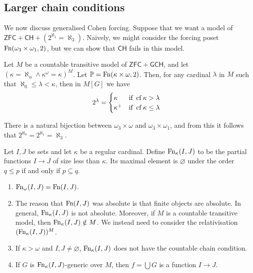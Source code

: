 \subsection{Larger chain conditions}
We now discuss generalised Cohen forcing.
Suppose that we want a model of \( \mathsf{ZFC} + \mathsf{CH} + (2^{\aleph_1} = \aleph_3) \).
Naively, we might consider the forcing poset \( \operatorname{Fn}(\omega_3 \times \omega_1, 2) \), but we can show that \( \mathsf{CH} \) fails in this model.
\begin{proposition}
    Let \( M \) be a countable transitive model of \( \mathsf{ZFC} + \mathsf{GCH} \), and let \( (\kappa = \aleph_\alpha \wedge \kappa^\omega = \kappa)^M \).
    Let \( \mathbb P = \operatorname{Fn}(\kappa \times \omega, 2) \).
    Then, for any cardinal \( \lambda \) in \( M \) such that \( \aleph_0 \leq \lambda < \kappa \), then in \( M[G] \) we have
    \[ 2^\lambda = \begin{cases}
        \kappa & \text{if } \operatorname{cf} \kappa > \lambda \\
        \kappa^+ & \text{if } \operatorname{cf} \kappa \leq \lambda
    \end{cases} \]
\end{proposition}
There is a natural bijection between \( \omega_3 \times \omega \) and \( \omega_3 \times \omega_1 \), and from this it follows that \( 2^{\aleph_0} = 2^{\aleph_1} = \aleph_3 \).
\begin{definition}
    Let \( I, J \) be sets and let \( \kappa \) be a regular cardinal.
    Define \( \operatorname{Fn}_\kappa(I, J) \) to be the partial functions \( I \to J \) of size less than \( \kappa \).
    Its maximal element is \( \varnothing \) under the order \( q \leq p \) if and only if \( p \subseteq q \).
\end{definition}
\begin{remark}
    \begin{enumerate}
        \item \( \operatorname{Fn}_\omega(I, J) = \operatorname{Fn}(I, J) \).
        \item The reason that \( \operatorname{Fn}(I, J) \) was absolute is that finite objects are absolute.
        In general, \( \operatorname{Fn}_\kappa(I, J) \) is not absolute.
        Moreover, if \( M \) is a countable transitive model, then \( \operatorname{Fn}_\kappa(I, J) \notin M \).
        We instead need to consider the relativisation \( (\operatorname{Fn}_\kappa(I, J))^M \).
        \item If \( \kappa > \omega \) and \( I, J \neq \varnothing \), \( \operatorname{Fn}_\kappa(I, J) \) does not have the countable chain condition.
        \item If \( G \) is \( \operatorname{Fn}_\kappa(I, J) \)-generic over \( M \), then \( f = \bigcup G \) is a function \( I \to J \).
    \end{enumerate}
\end{remark}
